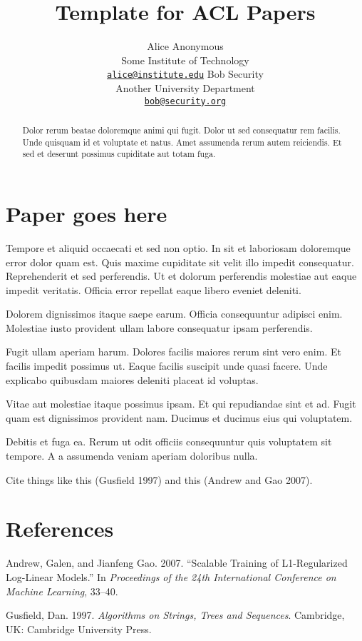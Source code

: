\documentclass[11pt,a4paper]{article}
\title{Template for ACL Papers}
\author{
    Alice Anonymous \\ Some Institute of Technology \\ {\tt {\normalsize \href{mailto:alice@institute.edu}{\nolinkurl{alice@institute.edu}}}} \And
    Bob Security \\ Another University Department \\ {\tt {\normalsize \href{mailto:bob@security.org}{\nolinkurl{bob@security.org}}}} }
\date{}
\begin{document}
\maketitle
\begin{abstract}
Dolor rerum beatae doloremque animi qui fugit. Dolor ut sed consequatur
rem facilis. Unde quisquam id et voluptate et natus. Amet assumenda
rerum autem reiciendis. Et sed et deserunt possimus cupiditate aut totam
fuga.
\end{abstract}

\section{Paper goes here}\label{paper-goes-here}

Tempore et aliquid occaecati et sed non optio. In sit et laboriosam
doloremque error dolor quam est. Quis maxime cupiditate sit velit illo
impedit consequatur. Reprehenderit et sed perferendis. Ut et dolorum
perferendis molestiae aut eaque impedit veritatis. Officia error
repellat eaque libero eveniet deleniti.

Dolorem dignissimos itaque saepe earum. Officia consequuntur adipisci
enim. Molestiae iusto provident ullam labore consequatur ipsam
perferendis.

Fugit ullam aperiam harum. Dolores facilis maiores rerum sint vero enim.
Et facilis impedit possimus ut. Eaque facilis suscipit unde quasi
facere. Unde explicabo quibusdam maiores deleniti placeat id voluptas.

Vitae aut molestiae itaque possimus ipsam. Et qui repudiandae sint et
ad. Fugit quam est dignissimos provident nam. Ducimus et ducimus eius
qui voluptatem.

Debitis et fuga ea. Rerum ut odit officiis consequuntur quis voluptatem
sit tempore. A a assumenda veniam aperiam doloribus nulla.

Cite things like this (Gusfield 1997) and this (Andrew and Gao 2007).

\section*{References}\label{references}

\hypertarget{refs}{}
\hypertarget{ref-andrew2007scalable}{}
Andrew, Galen, and Jianfeng Gao. 2007. ``Scalable Training of
L1-Regularized Log-Linear Models.'' In \emph{Proceedings of the 24th
International Conference on Machine Learning}, 33--40.

\hypertarget{ref-Gusfield:97}{}
Gusfield, Dan. 1997. \emph{Algorithms on Strings, Trees and Sequences}.
Cambridge, UK: Cambridge University Press.
\end{document}
